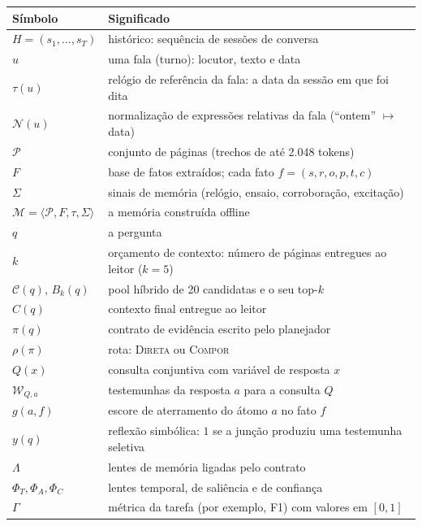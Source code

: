 \documentclass[11pt]{article}
\newcommand{\Compose}{\textsc{Compor}}
\newcommand{\Direct}{\textsc{Direta}}
\begin{document}
\begin{center}
\small
\begin{tabularx}{\textwidth}{@{}lX@{}}
\toprule
Símbolo & Significado \\
\midrule
$H=(s_1,\dots,s_T)$ & histórico: sequência de sessões de conversa \\
$u$ & uma fala (turno): locutor, texto e data \\
$\tau(u)$ & relógio de referência da fala: a data da sessão em que foi dita \\
$\mathcal{N}(u)$ & normalização de expressões relativas da fala (``ontem'' $\mapsto$ data) \\
$\mathcal{P}$ & conjunto de páginas (trechos de até 2.048 tokens) \\
$F$ & base de fatos extraídos; cada fato $f=(s,r,o,p,t,c)$ \\
$\Sigma$ & sinais de memória (relógio, ensaio, corroboração, excitação) \\
$\mathcal{M}=\langle\mathcal{P},F,\tau,\Sigma\rangle$ & a memória construída offline \\
$q$ & a pergunta \\
$k$ & orçamento de contexto: número de páginas entregues ao leitor ($k=5$) \\
$\mathcal{C}(q)$, $B_k(q)$ & pool híbrido de 20 candidatas e o seu top-$k$ \\
$C(q)$ & contexto final entregue ao leitor \\
$\pi(q)$ & contrato de evidência escrito pelo planejador \\
$\rho(\pi)$ & rota: \Direct{} ou \Compose{} \\
$Q(x)$ & consulta conjuntiva com variável de resposta $x$ \\
$\mathcal{W}_{Q,a}$ & testemunhas da resposta $a$ para a consulta $Q$ \\
$g(a,f)$ & escore de aterramento do átomo $a$ no fato $f$ \\
$y(q)$ & reflexão simbólica: $1$ se a junção produziu uma testemunha seletiva \\
$\Lambda$ & lentes de memória ligadas pelo contrato \\
$\Phi_T,\Phi_A,\Phi_C$ & lentes temporal, de saliência e de confiança \\
$\Gamma$ & métrica da tarefa (por exemplo, F1) com valores em $[0,1]$ \\
\bottomrule
\end{tabularx}
\end{center}
\end{document}
